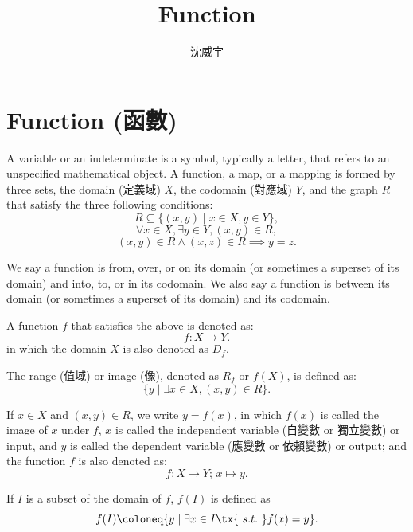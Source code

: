 \documentclass[a4paper,12pt]{article}
\begin{document}
\title{Function}
\author{沈威宇}
\date{\temtoday}
\titletocdoc
\section{Function (函數)}
A variable or an indeterminate is a symbol, typically a letter, that refers to an unspecified mathematical object.
A function, a map, or a mapping is formed by three sets, the domain (定義域) $X$, the codomain (對應域) $Y$, and the graph $R$ that satisfy the three following conditions:
\[R\subseteq \{(x,y)\mid x\in X,y\in Y\},\]
\[\forall x\in X,\exists y\in Y,\left(x,y\right)\in R ,\]
\[ (x,y)\in R\land (x,z)\in R\implies y=z.\]

We say a function is from, over, or on its domain (or sometimes a superset of its domain) and into, to, or in its codomain. We also say a function is between its domain (or sometimes a superset of its domain) and its codomain.

A function $f$ that satisfies the above is denoted as:
\[f\colon X\to Y.\]
in which the domain $X$ is also denoted as $D_f$.

The range (值域) or image (像), denoted as $R_f$ or $f(X)$, is defined as:
\[\{ y \mid \exists x \in X, (x, y) \in R \}.\]

If $x\in X$ and $(x, y) \in R$, we write $y = f(x)$, in which $f(x)$ is called the image of $x$ under $f$, $x$ is called the independent variable (自變數 or 獨立變數) or input, and $y$ is called the dependent variable (應變數 or 依賴變數) or output; and the function $f$ is also denoted as:
\[f \colon X \to Y;\, x \mapsto y.\]

If $I$ is a subset of the domain of $f$, $f(I)$ is defined as
\[f(I)\coloneq\{y\mid\exists x\in I \tx{\ s.t.\ }f(x)=y\}.\]
\end{document}

